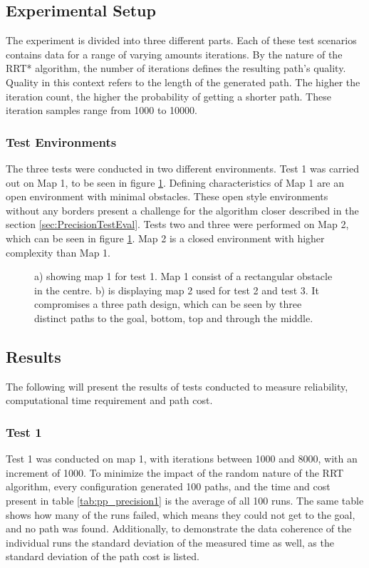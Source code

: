\subsection{Experimental Setup}
The experiment is divided into three different parts. Each of these test scenarios contains data for a range of varying amounts iterations. By the nature of the RRT* algorithm, the number of iterations defines the resulting path's quality. Quality in this context refers to the length of the generated path. The higher the iteration count, the higher the probability of getting a shorter path. These iteration samples range from 1000 to 10000. 

\subsubsection{Test Environments}

The three tests were conducted in two different environments. Test 1 was carried out on Map 1, to be seen in figure \ref{fig:PrecisionTestMaps}. Defining characteristics of Map 1 are an open environment with minimal obstacles. These open style environments without any borders present a challenge for the algorithm closer described in the section \ref{sec:PrecisionTestEval}. Tests two and three were performed on Map 2, which can be seen in figure \ref{fig:PrecisionTestMaps}. Map 2 is a closed environment with higher complexity than Map 1.  

\begin{figure}[h]
	\centering
	
	\caption{a) showing map 1 for test 1. Map 1 consist of a rectangular obstacle in the centre. b) is displaying map 2 used for test 2 and test 3. It compromises a three path design, which can be seen by three distinct paths to the goal, bottom, top and through the middle.}
	\label{fig:PrecisionTestMaps}
\end{figure}


\subsection{Results}
\label{sec:PrecisionTestResults}
The following will present the results of tests conducted to measure reliability, computational time requirement and path cost.

\subsubsection{Test 1}
\label{sec:test1}
Test 1 was conducted on map 1, with iterations between 1000 and 8000, with an increment of 1000. To minimize the impact of the random nature of the RRT algorithm, every configuration generated 100 paths, and the time and cost present in table \ref{tab:pp_precision1} is the average of all 100 runs. The same table shows how many of the runs failed, which means they could not get to the goal, and no path was found. Additionally, to demonstrate the data coherence of the individual runs the standard deviation of the measured time as well, as the standard deviation of the path cost is listed.   

